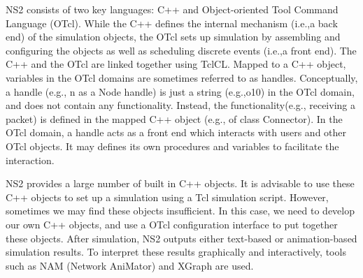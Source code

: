 NS2 consists of two key languages: C++ and Object-oriented Tool Command Language (OTcl). While the C++ defines the internal mechanism (i.e.,a back end) of the simulation objects, the OTcl sets up simulation by assembling and configuring the objects as well as scheduling discrete events (i.e.,a front end). The C++ and the OTcl are linked together using TclCL. Mapped to a C++ object, variables in the OTcl domains are sometimes referred to as handles. Conceptually, a handle (e.g., n as a Node handle) is just a string (e.g.,o10) in the OTcl domain, and does not contain any functionality. Instead, the functionality(e.g., receiving a packet) is defined in the mapped C++ object (e.g., of class Connector). In the OTcl domain, a handle acts as a front end which interacts with users and other OTcl objects. It may defines its own procedures and variables to facilitate the interaction. 
 \par
 NS2 provides a large number of built in C++ objects. It is advisable to use these C++ objects to set up a simulation using a Tcl simulation script. However, sometimes we may find these objects insufficient. In this case, we need to develop our own C++ objects, and use a OTcl configuration interface to put together these objects. After simulation, NS2 outputs either text-based or animation-based simulation results. To interpret these results graphically and interactively, tools such as NAM (Network AniMator) and XGraph are used.
